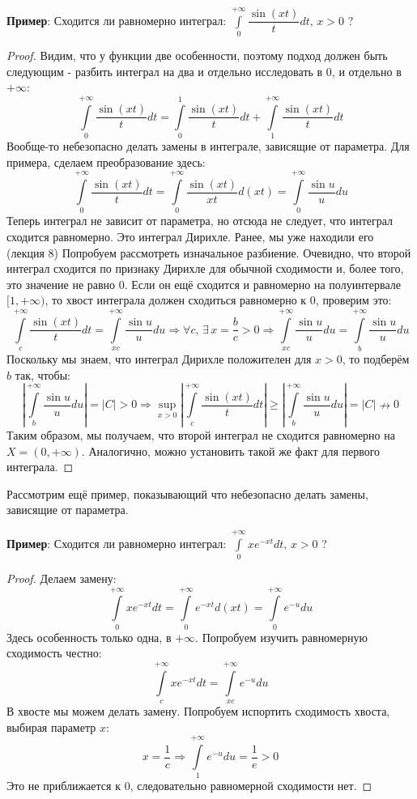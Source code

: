 \documentclass[12pt]{article}
\theoremstyle{definition}
\newcommand{\ddint}[2]{\displaystyle\int\limits_{#1}^{#2}}
\begin{document}
\textbf{Пример}: Сходится ли равномерно интеграл: $\ddint{0}{+\infty}\dfrac{\sin{(xt)}}{t}dt, \, x > 0$ ?
\begin{proof}
	Видим, что у функции две особенности, поэтому подход должен быть следующим - разбить интеграл на два и отдельно исследовать в $0$, и отдельно в $+\infty$:
	$$
		\ddint{0}{+\infty}\dfrac{\sin{(xt)}}{t}dt = \ddint{0}{1}\dfrac{\sin{(xt)}}{t}dt + \ddint{1}{+\infty}\dfrac{\sin{(xt)}}{t}dt
	$$
	Вообще-то небезопасно делать замены в интеграле, зависящие от параметра. Для примера, сделаем преобразование здесь:
	$$
		\ddint{0}{+\infty}\dfrac{\sin{(xt)}}{t}dt = \ddint{0}{+\infty}\dfrac{\sin{(xt)}}{xt}d(xt) = \ddint{0}{+\infty}\dfrac{\sin{u}}{u}du
	$$
	Теперь интеграл не зависит от параметра, но отсюда не следует, что интеграл сходится равномерно. Это интеграл Дирихле. Ранее, мы уже находили его (лекция $8$) Попробуем рассмотреть изначальное разбиение. Очевидно, что второй интеграл сходится по признаку Дирихле для обычной сходимости и, более того, это значение не равно $0$. Если он ещё сходится и равномерно на полуинтервале $[1, +\infty)$, то хвост интеграла должен сходиться равномерно к $0$, проверим это:
	$$
		\ddint{c}{+\infty}\dfrac{\sin{(xt)}}{t}dt = \ddint{xc}{+\infty}\dfrac{\sin{u}}{u}du \Rightarrow \forall c, \, \exists \, x = \dfrac{b}{c} > 0 \Rightarrow \ddint{xc}{+\infty}\dfrac{\sin{u}}{u}du = \ddint{b}{+\infty}\dfrac{\sin{u}}{u}du 
	$$
	Поскольку мы знаем, что интеграл Дирихле положителен для $x > 0$, то подберём $b$ так, чтобы:
	$$
		\left|\ddint{b}{+\infty}\dfrac{\sin{u}}{u}du\right| = |C| > 0 \Rightarrow \sup\limits_{x > 0}\left|\ddint{c}{+\infty}\dfrac{\sin{(xt)}}{t}dt\right| \geq \left|\ddint{b}{+\infty}\dfrac{\sin{u}}{u}du\right| = |C| \nrightarrow 0
	$$
	Таким образом, мы получаем, что второй интеграл не сходится равномерно на $X = (0,+\infty)$. Аналогично, можно установить такой же факт для первого интеграла. 
\end{proof}

Рассмотрим ещё пример, показывающий что небезопасно делать замены, зависящие от параметра.

\textbf{Пример}: Сходится ли равномерно интеграл: $\ddint{0}{+\infty}xe^{-xt}dt, \, x > 0$ ?
\begin{proof}
	Делаем замену:
	$$
		\ddint{0}{+\infty}xe^{-xt}dt = \ddint{0}{+\infty}e^{-xt}d(xt) = \ddint{0}{+\infty}e^{-u}du
	$$
	Здесь особенность только одна, в $+\infty$. Попробуем изучить равномерную сходимость честно:
	$$
		\ddint{c}{+\infty}xe^{-xt}dt = \ddint{xc}{+\infty}e^{-u}du
	$$
	В хвосте мы можем делать замену. Попробуем испортить сходимость хвоста, выбирая параметр $x$:
	$$
		x = \dfrac{1}{c} \Rightarrow \ddint{1}{+\infty}e^{-u}du = \dfrac{1}{e} > 0
	$$
	Это не приближается к $0$, следовательно равномерной сходимости нет.
\end{proof}
\end{document}
